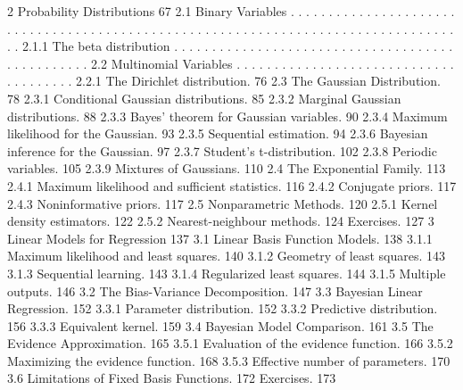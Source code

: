 \documentclass[
  10
]{article}
\begin{document}
2 Probability Distributions 67 2.1 Binary Variables . . . . . . . . . .
. . . . . . . . . . . . . . . . . . . . . . . . . . . . . . . . . . . .
. . . . . . . . . . . . . . . . . . . . . . . . . . . . . . . . . . . .
. 2.1.1 The beta distribution . . . . . . . . . . . . . . . . . . . . .
. . . . . . . . . . . . . . . . . . . . . . . . . . . 2.2 Multinomial
Variables . . . . . . . . . . . . . . . . . . . . . . . . . . . . . . .
. . . . . . . 2.2.1 The Dirichlet distribution. 76 2.3 The Gaussian
Distribution. 78 2.3.1 Conditional Gaussian distributions. 85 2.3.2
Marginal Gaussian distributions. 88 2.3.3 Bayes' theorem for Gaussian
variables. 90 2.3.4 Maximum likelihood for the Gaussian. 93 2.3.5
Sequential estimation. 94 2.3.6 Bayesian inference for the Gaussian. 97
2.3.7 Student's t-distribution. 102 2.3.8 Periodic variables. 105 2.3.9
Mixtures of Gaussians. 110 2.4 The Exponential Family. 113 2.4.1 Maximum
likelihood and sufficient statistics. 116 2.4.2 Conjugate priors. 117
2.4.3 Noninformative priors. 117 2.5 Nonparametric Methods. 120 2.5.1
Kernel density estimators. 122 2.5.2 Nearest-neighbour methods. 124
Exercises. 127 3 Linear Models for Regression 137 3.1 Linear Basis
Function Models. 138 3.1.1 Maximum likelihood and least squares. 140
3.1.2 Geometry of least squares. 143 3.1.3 Sequential learning. 143
3.1.4 Regularized least squares. 144 3.1.5 Multiple outputs. 146 3.2 The
Bias-Variance Decomposition. 147 3.3 Bayesian Linear Regression. 152
3.3.1 Parameter distribution. 152 3.3.2 Predictive distribution. 156
3.3.3 Equivalent kernel. 159 3.4 Bayesian Model Comparison. 161 3.5 The
Evidence Approximation. 165 3.5.1 Evaluation of the evidence function.
166 3.5.2 Maximizing the evidence function. 168 3.5.3 Effective number
of parameters. 170 3.6 Limitations of Fixed Basis Functions. 172
Exercises. 173
\end{document}
